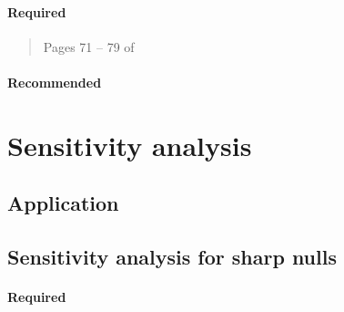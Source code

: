 \documentclass[12pt]{article}
\begin{document}
\paragraph*{Required}

\begin{verse}
\end{verse}

\begin{verse}
 Pages 71 -- 79 of 
\end{verse}

\paragraph*{Recommended}

\begin{verse}
\end{verse}

\begin{verse}
\end{verse}

\begin{verse}
\end{verse}

\begin{verse}
\end{verse}

\section{Sensitivity analysis}

\subsection*{Application}

\begin{verse}  \end{verse}

\subsection{Sensitivity analysis for sharp nulls}

\paragraph*{Required}
\end{document}
